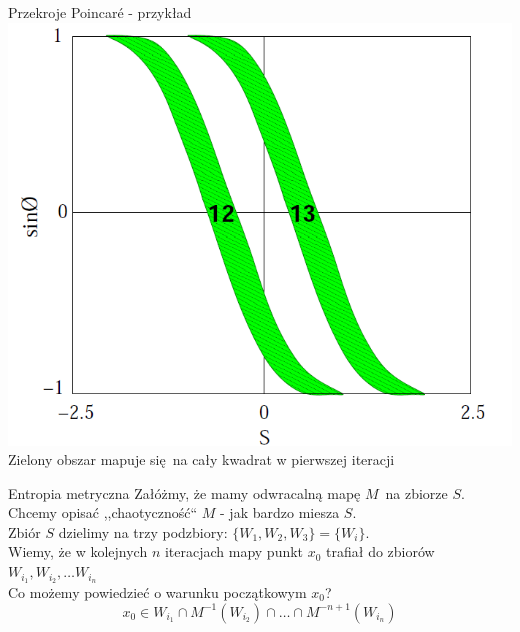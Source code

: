 \documentclass{beamer}
\begin{document}
\begin{frame}{Przekroje Poincaré - przykład}
\centering
\includegraphics[height=0.7\textheight]{poincare_section}\\
Zielony obszar mapuje się na cały kwadrat w pierwszej iteracji
\end{frame}

\begin{frame}{Entropia metryczna} \pause
	Załóżmy, że mamy odwracalną mapę $M$ na zbiorze $S$.\pause \\
	Chcemy opisać ,,chaotyczność`` $M$ - jak bardzo miesza $S$.\\ \pause
	Zbiór $S$ dzielimy na trzy podzbiory: $\{W_1, W_2, W_3\} = \{W_i\}$.\\\pause
	Wiemy, że w kolejnych $n$ iteracjach mapy punkt $x_0$ trafiał do zbiorów
  $W_{i_1}, W_{i_2}, \dots W_{i_n}$\pause\\
	Co możemy powiedzieć o warunku początkowym $x_0$?\pause
	\begin{equation*}
		x_0 \in W_{i_1} \cap M^{-1}(W_{i_2}) \cap \dots \cap M^{-n+1}(W_{i_n})
	\end{equation*}
\end{frame}
\end{document}

